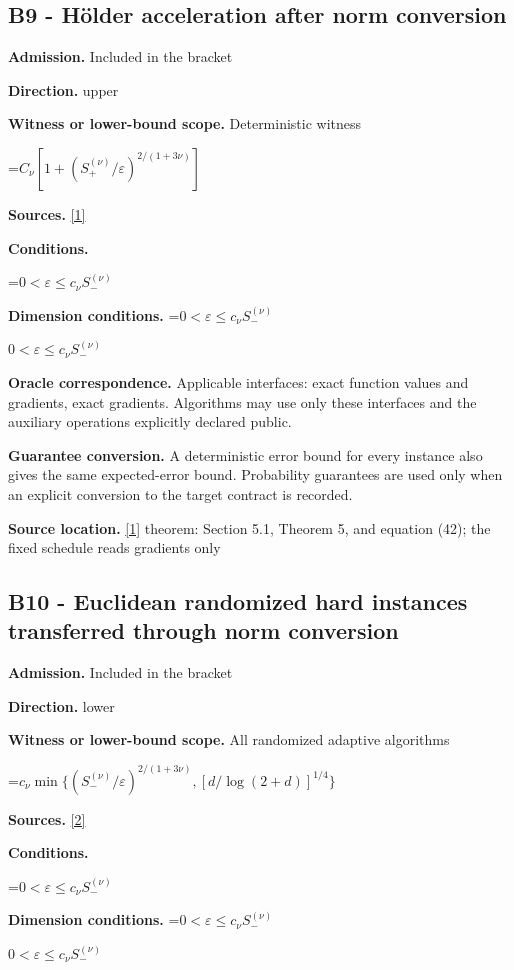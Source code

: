 \documentclass[10pt,a4paper]{article}
\newcommand{\AtlasMath}[1]{\par\begingroup\centering\setbox0=\hbox{$\displaystyle #1$}\ifdim\wd0>1.4\linewidth\typeout{ATLAS WIDE FORMULA: \the\wd0}\fi\ifdim\wd0>\linewidth\resizebox{\linewidth}{!}{\box0}\else\box0\fi\par\endgroup}
\newcommand{\AtlasInlineMath}[1]{\begingroup\setbox0=\hbox{$#1$}\ifdim\wd0>.4\linewidth\endgroup\AtlasMath{#1}\else\endgroup$#1$\fi}
\begin{document}
\subsection{B9 - Hölder acceleration after norm conversion}
\textbf{Admission.} Included in the bracket

\textbf{Direction.} upper

\textbf{Witness or lower-bound scope.} Deterministic witness

\AtlasMath{C_\nu[1+(S_+^{(\nu)}/\varepsilon)^{2/(1+3\nu)}]}
\textbf{Sources.} \href{https://optimization-online.org/wp-content/uploads/2010/12/2865.pdf}{[1]}

\textbf{Conditions.} 
\AtlasMath{0<\varepsilon\le c_\nu S_-^{(\nu)}}


\textbf{Dimension conditions.} \AtlasInlineMath{0<\varepsilon\le c_\nu S_-^{(\nu)}}

\textbf{Oracle correspondence.} Applicable interfaces: exact function values and gradients, exact gradients. Algorithms may use only these interfaces and the auxiliary operations explicitly declared public.

\textbf{Guarantee conversion.} A deterministic error bound for every instance also gives the same expected-error bound. Probability guarantees are used only when an explicit conversion to the target contract is recorded.

\textbf{Source location.} \href{https://optimization-online.org/wp-content/uploads/2010/12/2865.pdf}{[1]} theorem: Section 5.1, Theorem 5, and equation (42); the fixed schedule reads gradients only

\subsection{B10 - Euclidean randomized hard instances transferred through norm conversion}
\textbf{Admission.} Included in the bracket

\textbf{Direction.} lower

\textbf{Witness or lower-bound scope.} All randomized adaptive algorithms

\AtlasMath{c_\nu\min\{(S_-^{(\nu)}/\varepsilon)^{2/(1+3\nu)},[d/\log(2+d)]^{1/4}\}}
\textbf{Sources.} \href{https://proceedings.mlr.press/v99/diakonikolas19c/diakonikolas19c.pdf}{[2]}

\textbf{Conditions.} 
\AtlasMath{0<\varepsilon\le c_\nu S_-^{(\nu)}}


\textbf{Dimension conditions.} \AtlasInlineMath{0<\varepsilon\le c_\nu S_-^{(\nu)}}
\end{document}
